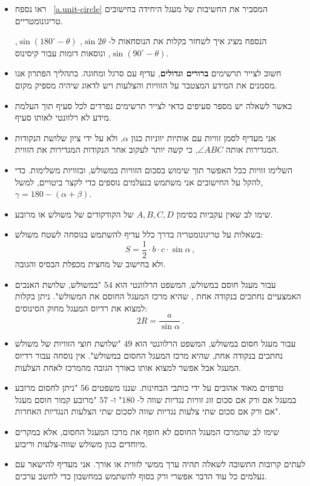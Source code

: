 \begin{itemize}

\item
ראו נספח~%
\ref{a.unit-circle}
המסביר את החשיבות של מעגל היחידה בחישובים טריגונומטריים.

הנספח מציג איך לשחזר בקלות את הנוסחאות ל-%
$\sin 2\theta$, $\sin (180^\circ-\theta)$, $\sin (90^\circ-\theta)$,
ונוסאות דומות עבור קיסינוס.

\item
חשוב לצייר תרשימים 
\textbf{ברורים וגדולים},
עדיף עם סרגל ומחוגה. בתהליך הפתרון אנו מסמנים את המידע המצטבר על הזוויות והצלעות ויש לדאוג שיהיה מספיק מקום.

\item
כאשר לשאלה יש מספר סעיפים כדאי לצייר תרשימים נפרדים לכל סעיף תוך העלמת מידע לא רלוונטי לאותו סעיף.

\item
אני מעדיף לסמן זוויות עם אותיות יווניות כגון
$\alpha$,
ולא על ידי ציון שלושת הנקודות המגדירות אותה
$\angle ABC$,
כי קשה יותר לעקוב אחר הנקודות המגדירות את הזווית.

\item
השלימו זוויות ככל האפשר תוך שימוש בסכום הזוויות במשולש, ובזוויות משלימות. כדי להקל על החישובים אני משתמש בנעלמים נוספים כדי לקצר ביטויים, למשל,
$\gamma=180-(\alpha+\beta)$.

\item
שימו לב שאין עקביות בסימון 
$A,B,C,D$
של הקודקודים של משולש או מרובע.


\item 
בשאלות על טריגונומטריה בדרך כלל עדיף להשתמש בנוסחה לשטח משולש:
\[
S=\frac{1}{2}\cdot b \cdot c \cdot\sin \alpha\,,
\]
ולא בחישוב של מחצית מכפלת הבסיס והגובה.

\item
עבור מעגל חוסם במשולש, המשפט הרלוונטי הוא
$54$
"במשולש, שלושת האנכים האמצעיים נחתכים בנקודה אחת , שהיא מרכז המעגל החוסם את המשולש". ניתן בקלות למצוא את רדיוס המעגל מחוק הסינוסים:
\[
2R=\frac{a}{\sin\alpha}\,.
\]
\vspace{-4ex}
\item
עבור מעגל חסום במשולש, המשפט הרלוונטי הוא
$49$
"שלושת חוצי הזוויות של משולש נחתכים בנקודה אחת, שהיא מרכז המעגל החסום במשולש". אין נוסחה עבור רדיוס המעגל אבל אפשר למצוא אותו כאורך הגובה מהמרכז לאחת הצלעות.


\item 
טרפזים מאוד אהובים על ידי כותבי הבחינות. שננו משפטים
$56$
"ניתן לחסום מרובע במעגל אם ורק אם סכום זוג זוויות נגדיות שווה ל-%
$180$"
ו-%
$57$
"מרובע קמור חוסם מעגל אם ורק אם סכום שתי צלעות נגדיות שווה לסכום שתי הצלעות הנגדיות האחרות".

\item
שימו לב שהמרכז המעגל החוסם לא חופף את מרכז המעגל החסום, אלא במקרים מיוחדים כגון משולש שווה-צלעות וריבוע.


\item
לעתים קרובות התשובה לשאלה תהיה ערך ממשי לזווית או אורך. אני מעדיף להישאר עם נעלמים כל עוד הדבר אפשרי ורק בסוף להשתמש במחשבון כדי לחשב ערכים.


\end{itemize}

